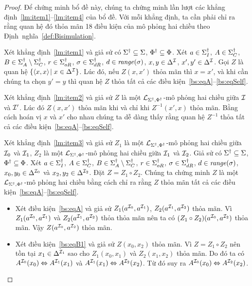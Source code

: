 \begin{proof}
	Để chứng minh bổ đề này, chúng ta chứng minh lần lượt các khẳng định~\ref{lm:item1}--\ref{lm:item4} của bổ đề. Với mỗi khẳng định, ta cần phải chỉ ra rằng quan hệ đó thỏa mãn 18 điều kiện của mô phỏng hai chiều theo Định~nghĩa~\ref{def:Bisimulation}.
	
	\semiItem Xét khẳng định~\eqref{lm:item1} và giả sử có $\Sigma^\dag \subseteq \Sigma$, $\Phi^\dag \subseteq \Phi$. Xét $a \in \Sigma^\dag_I$, $A \in \Sigma^\dag_C$, $B \in \Sigma^\dag_A\setminus\Sigma^\dag_C$, $r \in \Sigma^\dag_{oR}$, $\sigma \in \Sigma^\dag_{dR}$, $d \in \mathit{range}(\sigma)$, $x,y \in \Delta^{\mathcal{I}}$, $x',y' \in \Delta^{\mathcal{I}}$.
	Gọi $Z$ là quan hệ $\{\left\langle x,x\right\rangle\! \mid x \in \Delta^{\mathcal{I}}\}$. Lúc đó, nếu $Z(x, x')$ thỏa mãn thì $x = x'$, và khi cần chúng ta chọn $y' = y$ thì quan hệ $Z$ thỏa tất cả các điều kiện~\eqref{bs:eqA}--\eqref{bs:eqSelf}.
	
	\semiItem Xét khẳng định~\eqref{lm:item2} và giả sử $Z$ là một $\mathcal{L}_{\Sigma^\dag,\Phi^\dag}$-mô phỏng hai chiều giữa $\mathcal{I}$ và $\mathcal{I}'$. Lúc đó $Z(x, x')$ thỏa mãn khi và chỉ khi $Z^{-1}(x', x)$ thỏa mãn. Bằng cách hoán vị $x$ và $x'$ cho nhau chúng ta dễ dàng thấy rằng quan hệ $Z^{-1}$ thỏa tất cả các điều kiện~\eqref{bs:eqA}--\eqref{bs:eqSelf}.
	
	\semiItem Xét khẳng định~\eqref{lm:item3} và giả sử $Z_1$ là một $\mathcal{L}_{\Sigma^\dag,\Phi^\dag}$-mô phỏng hai chiều giữa $\mathcal{I}_0$ và $\mathcal{I}_1$, $Z_2$ là một $\mathcal{L}_{\Sigma^\dag,\Phi^\dag}$-mô phỏng hai chiều giữa $\mathcal{I}_1$ và $\mathcal{I}_2$.
	Giả sử có $\Sigma^\dag \subseteq \Sigma$, $\Phi^\dag \subseteq \Phi$. Xét $a \in \Sigma^\dag_I$, $A \in \Sigma^\dag_C$, $B \in \Sigma^\dag_A\setminus\Sigma^\dag_C$, $r \in \Sigma^\dag_{oR}$, $\sigma \in \Sigma^\dag_{dR}$, $d \in \mathit{range}(\sigma)$, $x_0,y_0 \in \Delta^{\mathcal{I}_0}$ và $x_2,y_2 \in \Delta^{\mathcal{I}_2}$. Đặt $Z = Z_1 \circ Z_2$. Chúng ta chứng minh $Z$ là một $\mathcal{L}_{\Sigma^\dag,\Phi^\dag}$-mô phỏng hai chiều bằng cách chỉ ra rằng $Z$ thỏa mãn tất cả các điều kiện~\eqref{bs:eqA}--\eqref{bs:eqSelf}.
	
	\begin{itemize}
		\item Xét điều kiện~\eqref{bs:eqA} và giả sử $Z_1(a^{\mathcal{I}_0}, a^{\mathcal{I}_1})$, $Z_2(a^{\mathcal{I}_1}, a^{\mathcal{I}_2})$ thỏa mãn. Vì $Z_1(a^{\mathcal{I}_0}, a^{\mathcal{I}_1})$ và $Z_2(a^{\mathcal{I}_1}, a^{\mathcal{I}_2})$ thỏa thỏa mãn nên ta có $(Z_1 \circ Z_2)(a^{\mathcal{I}_0}, a^{\mathcal{I}_2})$ thỏa mãn. Vậy $Z(a^{\mathcal{I}_0}, a^{\mathcal{I}_2})$ thỏa mãn.
	
		\item Xét điều kiện~\eqref{bs:eqB1} và giả sử $Z(x_0, x_2)$ thỏa mãn. Vì $Z = Z_1 \circ Z_2$ nên tồn tại $x_1 \in \Delta^{\mathcal{I}_1}$ sao cho $Z_1(x_0, x_1)$ và $Z_2(x_1, x_2)$ thỏa mãn. Do đó ta có $A^{\mathcal{I}_0}(x_0) \Leftrightarrow A^{\mathcal{I}_1}(x_1)$ và $A^{\mathcal{I}_1}(x_1) \Leftrightarrow A^{\mathcal{I}_2}(x_2)$. Từ đó suy ra $A^{\mathcal{I}_0}(x_0) \Leftrightarrow A^{\mathcal{I}_2}(x_2)$.
	

\end{itemize}
\end{proof}
